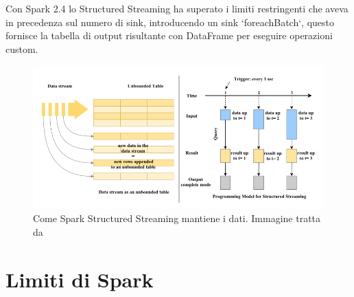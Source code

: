 \documentclass[12pt,italian]{article}
\begin{document}
Con Spark 2.4 lo Structured Streaming ha superato i limiti restringenti che aveva in precedenza sul numero di sink, introducendo un sink `foreachBatch`, questo fornisce la tabella di output risultante
con DataFrame per eseguire operazioni custom.
\begin{figure}
	\centering 
	\includegraphics[width=0.8\linewidth]{img/sparkStructuredStreaming.png}
	\caption{Come Spark Structured Streaming mantiene i dati. Immagine tratta da \cite{structuredStreaming}}
	\label{fig:StructuredStreaming}
\end{figure}
\section{Limiti di Spark}
\newpage
\printbibliography
\end{document}
